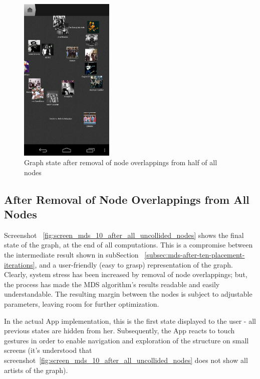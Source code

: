 \begin{figure}[H]
  \centering
    \includegraphics[width=0.4\textwidth]{figures/screen_mds_9_after_half_uncollided_nodes}
  \caption{Graph state after removal of node overlappings from half of all nodes}
  \label{fig:screen_mds_9_after_half_uncollided_nodes}
\end{figure}

\newpage
\subsection{After Removal of Node Overlappings from All Nodes}

Screenshot ~\ref{fig:screen_mds_10_after_all_uncollided_nodes} shows the final state of the graph, at the end of all computations. This is a compromise between the intermediate result shown in subSection ~\ref{subsec:mds-after-ten-placement-iterations}, and a user-friendly (easy to grasp) representation of the graph. Clearly, system stress has been increased by removal of node overlappings; but, the process has made the MDS algorithm's results readable and easily understandable. The resulting margin between the nodes is subject to adjustable parameters, leaving room for further optimization.

In the actual App implementation, this is the first state displayed to the user - all previous states are hidden from her. Subsequently, the App reacts to touch gestures in order to enable navigation and exploration of the structure on small screens (it's understood that screenshot~\ref{fig:screen_mds_10_after_all_uncollided_nodes} does not show all artists of the graph).

